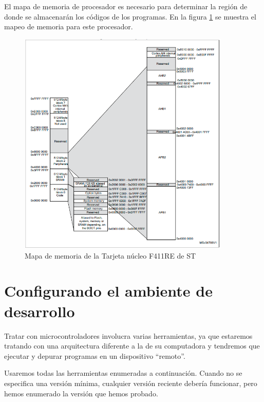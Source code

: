 El mapa de memoria de procesador es necesario para determinar la región de donde se almacenarán los códigos de los programas. En la figura \ref{cap1:003} se muestra el mapeo de memoria para este procesador.

\begin{figure}[htb]
	\centering
	\includegraphics[width=0.9\textwidth]{capitulo1/memoria.png}
	\caption{Mapa de memoria de la Tarjeta núcleo F411RE de ST}
	\label{cap1:003}
\end{figure} 

\section{Configurando el ambiente de desarrollo}

Tratar con microcontroladores involucra varias herramientas, ya que estaremos tratando con una arquitectura diferente a la de su computadora y tendremos que ejecutar y depurar programas en un dispositivo ``remoto''.

Usaremos todas las herramientas enumeradas a continuación. Cuando no se especifica una versión mínima, cualquier versión reciente debería funcionar, pero hemos enumerado la versión que hemos probado.

